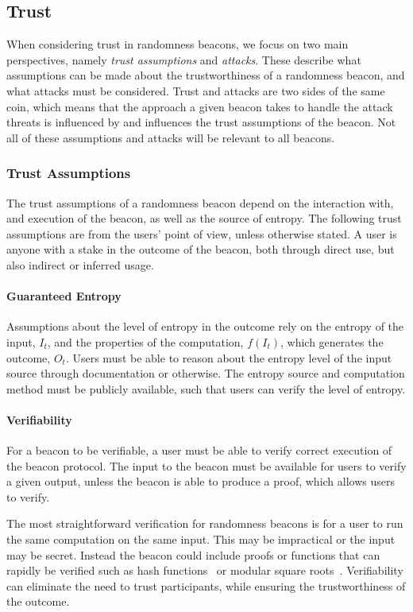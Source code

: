 \subsection{Trust}
When considering trust in randomness beacons, we focus on two main perspectives, namely \emph{trust assumptions} and \emph{attacks}.
These describe what assumptions can be made about the trustworthiness of a randomness beacon, and what attacks must be considered.
Trust and attacks are two sides of the same coin, which means that the approach a given beacon takes to handle the attack threats is influenced by and influences the trust assumptions of the beacon.
Not all of these assumptions and attacks will be relevant to all beacons.

\subsubsection{Trust Assumptions}\label{ssub:trust_assumptions}
The trust assumptions of a randomness beacon depend on the interaction with, and execution of the beacon, as well as the source of entropy.
The following trust assumptions are from the users' point of view, unless otherwise stated.
A user is anyone with a stake in the outcome of the beacon, both through direct use, but also indirect or inferred usage.

\paragraph{Guaranteed Entropy}
Assumptions about the level of entropy in the outcome rely on the entropy of the input, $I_t$, and the properties of the computation, $f(I_t)$, which generates the outcome, $O_t$.
Users must be able to reason about the entropy level of the input source through documentation or otherwise.
The entropy source and computation method must be publicly available, such that users can verify the level of entropy.

\paragraph{Verifiability}
For a beacon to be verifiable, a user must be able to verify correct execution of the beacon protocol.
The input to the beacon must be available for users to verify a given output, unless the beacon is able to produce a proof, which allows users to verify.

The most straightforward verification for randomness beacons is for a user to run the same computation on the same input.
This may be impractical or the input may be secret.
Instead the beacon could include proofs or functions that can rapidly be verified such as hash functions~\cite{nakamoto2008bitcoin} or modular square roots~\cite{lenstra2015random}.
Verifiability can eliminate the need to trust participants, while ensuring the trustworthiness of the outcome.

